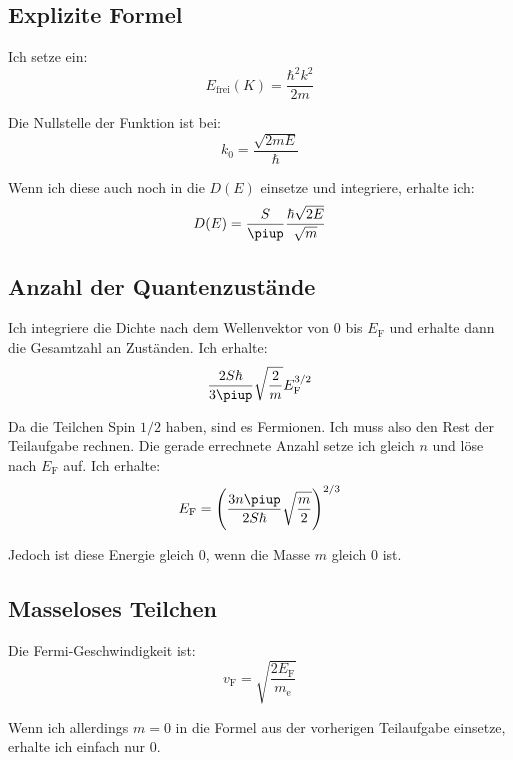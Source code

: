 \subsection{Explizite Formel}

Ich setze ein:
\[
	E_\text{frei}(K) = \frac{\hbar^2 k^2}{2m}
\]

Die Nullstelle der Funktion ist bei:
\[
	k_0 = \frac{\sqrt{2mE}}\hbar
\]

Wenn ich diese auch noch in die $D(E)$ einsetze und integriere, erhalte ich:
\[
	D(E) = \frac S\piup \frac{\hbar{\sqrt{2E}}}{\sqrt m}
\]

\subsection{Anzahl der Quantenzustände}

Ich integriere die Dichte nach dem Wellenvektor von $0$ bis $E_\text{F}$ und
erhalte dann die Gesamtzahl an Zuständen. Ich erhalte:
\[
	\frac{2S\hbar}{3\piup} \sqrt{\frac2m} E_\text{F}^{3/2}
\]

Da die Teilchen Spin $1/2$ haben, sind es Fermionen. Ich muss also den Rest der
Teilaufgabe rechnen. Die gerade errechnete Anzahl setze ich gleich $n$ und löse
nach $E_\text{F}$ auf. Ich erhalte:
\[
	E_\text{F} = \del{\frac{3 n \piup}{2 S \hbar} \sqrt{\frac m2}}^{2/3}
\]

Jedoch ist diese Energie gleich 0, wenn die Masse $m$ gleich 0 ist.

\subsection{Masseloses Teilchen}

Die Fermi-Geschwindigkeit ist:
\[
	v_\text{F} = \sqrt{\frac{2E_\text{F}}{m_\text{e}}}
\]

Wenn ich allerdings $m = 0$ in die Formel aus der vorherigen Teilaufgabe
einsetze, erhalte ich einfach nur 0.


\IfFileExists{\bibliographyfile}{
	
}{}



